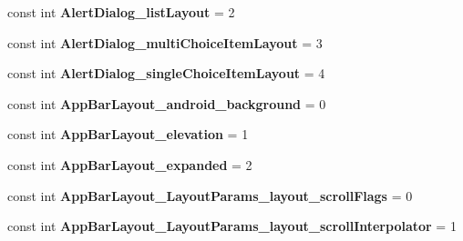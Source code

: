 \begin{DoxyCompactItemize}
const int {\bfseries Alert\+Dialog\+\_\+list\+Layout} = 2
\item 
\mbox{\label{class_sample_app_1_1_droid_1_1_resource_1_1_styleable_a709eff0b60dbfab38cd69e6617631dcb}} 
const int {\bfseries Alert\+Dialog\+\_\+multi\+Choice\+Item\+Layout} = 3
\item 
\mbox{\label{class_sample_app_1_1_droid_1_1_resource_1_1_styleable_a09ba0004df475d75ed082917a9146a1d}} 
const int {\bfseries Alert\+Dialog\+\_\+single\+Choice\+Item\+Layout} = 4
\item 
\mbox{\label{class_sample_app_1_1_droid_1_1_resource_1_1_styleable_a87da3faeb90d550c491be95336aad1a4}} 
const int {\bfseries App\+Bar\+Layout\+\_\+android\+\_\+background} = 0
\item 
\mbox{\label{class_sample_app_1_1_droid_1_1_resource_1_1_styleable_a6663afc04d8a008a3d505c0000ffbbe0}} 
const int {\bfseries App\+Bar\+Layout\+\_\+elevation} = 1
\item 
\mbox{\label{class_sample_app_1_1_droid_1_1_resource_1_1_styleable_ae676954f041b837187176b60c1e985c3}} 
const int {\bfseries App\+Bar\+Layout\+\_\+expanded} = 2
\item 
\mbox{\label{class_sample_app_1_1_droid_1_1_resource_1_1_styleable_ad6974bd3221c68c98317525f41f3479a}} 
const int {\bfseries App\+Bar\+Layout\+\_\+\+Layout\+Params\+\_\+layout\+\_\+scroll\+Flags} = 0
\item 
\mbox{\label{class_sample_app_1_1_droid_1_1_resource_1_1_styleable_a74b35d427a85e9773bf8d6e98fd5dedd}} 
const int {\bfseries App\+Bar\+Layout\+\_\+\+Layout\+Params\+\_\+layout\+\_\+scroll\+Interpolator} = 1
\item 
\mbox{\label{class_sample_app_1_1_droid_1_1_resource_1_1_styleable_a968f1c12f6b114dc6f94c88fec94d6ba}} 

\end{DoxyCompactItemize}

